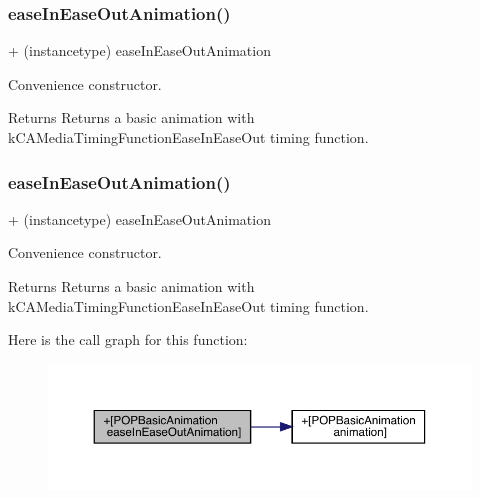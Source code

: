 \subsubsection{\texorpdfstring{ease\+In\+Ease\+Out\+Animation()}{easeInEaseOutAnimation()}\hspace{0.1cm}{\footnotesize\ttfamily [2/3]}}
{\footnotesize\ttfamily + (instancetype) ease\+In\+Ease\+Out\+Animation \begin{DoxyParamCaption}{ }\end{DoxyParamCaption}}

Convenience constructor. \begin{DoxyReturn}{Returns}
Returns a basic animation with k\+C\+A\+Media\+Timing\+Function\+Ease\+In\+Ease\+Out timing function. 
\end{DoxyReturn}
\mbox{\label{interface_p_o_p_basic_animation_a13f8eb84a553d3c366fac03fd5b71adb}} 
\subsubsection{\texorpdfstring{ease\+In\+Ease\+Out\+Animation()}{easeInEaseOutAnimation()}\hspace{0.1cm}{\footnotesize\ttfamily [3/3]}}
{\footnotesize\ttfamily + (instancetype) ease\+In\+Ease\+Out\+Animation \begin{DoxyParamCaption}{ }\end{DoxyParamCaption}}

Convenience constructor. \begin{DoxyReturn}{Returns}
Returns a basic animation with k\+C\+A\+Media\+Timing\+Function\+Ease\+In\+Ease\+Out timing function. 
\end{DoxyReturn}
Here is the call graph for this function\+:\nopagebreak
\begin{figure}[H]
\begin{center}
\leavevmode
\includegraphics[width=350pt]{interface_p_o_p_basic_animation_a13f8eb84a553d3c366fac03fd5b71adb_cgraph}
\end{center}
\end{figure}
\mbox{\label{interface_p_o_p_basic_animation_acc9d80c152ce8a12051fb83487bed541}} 
